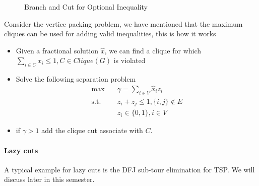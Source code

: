             \begin{figure}[H]
                \centering
                \caption {Branch and Cut for Optional Inequality}\label{OptInq}
            \end{figure}

            Consider the vertice packing problem, we have mentioned that the maximum cliques can be used for adding valid inequalities, this is how it works

            \begin{itemize}
                \item Given a fractional solution $\hat{x}$, we can find a clique for which $\sum_{i \in C} x_i \le 1, C \in Clique(G)$ is violated
                \item Solve the following separation problem
                \begin{align*}
                    \max \quad & \gamma = \sum_{i \in V} \hat{x}_i z_i\\
                    \text{s.t.} \quad & z_i + z_j \le 1, \{i, j\} \notin E\\
                    &z_i \in \{0, 1\}, i \in V
                \end{align*}
                \item if $\gamma > 1$ add the clique cut associate with $C$.
            \end{itemize}

        \paragraph{Lazy cuts}
            A typical example for lazy cuts is the DFJ sub-tour elimination for TSP. We will discuss later in this semester.

